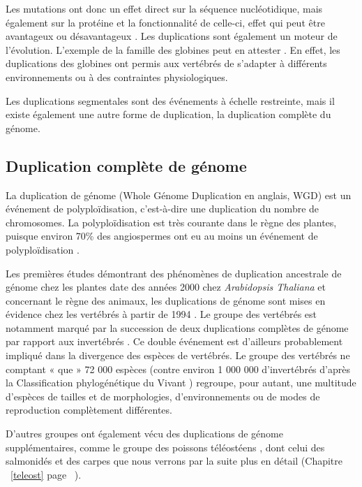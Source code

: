 \par Les mutations ont donc un effet direct sur la séquence nucléotidique, mais également sur la protéine et la fonctionnalité de celle-ci, effet qui peut être avantageux ou désavantageux \parencite{long_origin_2003}. Les duplications sont également un moteur de l’évolution. L’exemple de la famille des globines peut en attester \parencite{weatherall_molecular_1976}. En effet, les duplications des globines ont permis aux vertébrés de s’adapter à différents environnements ou à des contraintes physiologiques. 
\par Les duplications segmentales sont des événements à échelle restreinte, mais il existe également une autre forme de duplication, la duplication complète du génome.


\subsection{Duplication complète de génome}\label{wgd}
\par La duplication de génome (Whole Génome Duplication en anglais, WGD) est un événement de polyploïdisation, c’est-à-dire une duplication du nombre de chromosomes. La polyploïdisation est très courante dans le règne des plantes, puisque environ 70\% des angiospermes ont eu au moins un événement de polyploïdisation \parencite{masterson_stomatal_1994, soltis_polyploidy_2009}.
\par Les premières études démontrant des phénomènes de duplication ancestrale de génome chez les plantes date des années 2000 chez \textit{Arabidopsis Thaliana} \parencite{blanc_recent_2003, bowers_unravelling_2003, the_arabidopsis_genome_initiative_analysis_2000} et concernant le règne des animaux, les duplications de génome sont mises en évidence chez les vertébrés à partir de 1994 \parencite{holland_gene_1994, nakatani_reconstruction_2007}. Le groupe des vertébrés est notamment marqué par la succession de deux duplications complètes de génome par rapport aux invertébrés \parencite{dehal_two_2005}. Ce double événement est d’ailleurs probablement impliqué dans la divergence des espèces de vertébrés. Le groupe des vertébrés ne comptant « que » 72 000 espèces (contre environ 1 000 000 d’invertébrés d’après la Classification phylogénétique du Vivant \parencite{lecointre_classification_2016}) regroupe, pour autant, une multitude d’espèces de tailles et de morphologies, d’environnements ou de modes de reproduction complètement différentes.
\par D’autres groupes ont également vécu des duplications de génome supplémentaires, comme le groupe des poissons téléostéens \parencite{braasch_polyploidy_2012, meyer_2r_2005}, dont celui des salmonidés et des carpes \parencite{lien_atlantic_2016, xu_allotetraploid_2019} que nous verrons par la suite plus en détail (Chapitre  ~\ref{teleost} page ~\pageref{teleost}). 


